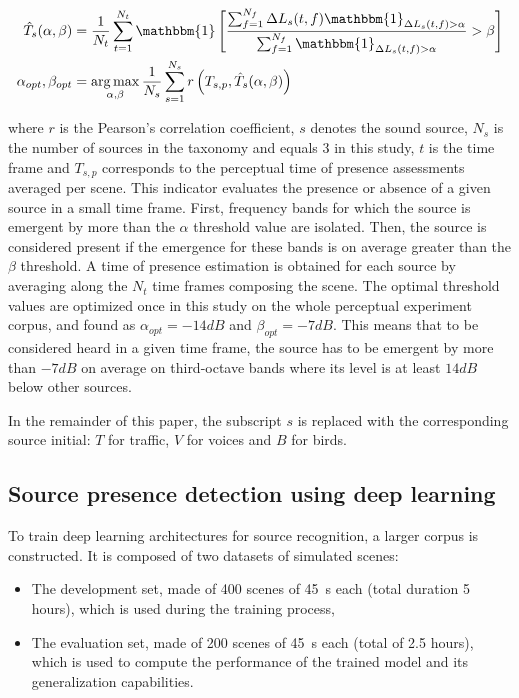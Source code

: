 \documentclass[11pt,a4paper]{article}
\DeclareMathOperator*{\argmax}{arg\,max}
\begin{document}
\begin{align}
\hat T_s(\alpha, \beta) &= \frac{1}{N_t}\sum_{t = 1}^{N_t}\mathbbm{1}\left[ \frac{\sum_{f = 1}^{N_f}\Delta L_{s}(t, f)\mathbbm{1}_{\Delta L_{s}(t, f)>\alpha}}{\sum_{f = 1}^{N_f}\mathbbm{1}_{\Delta L_{s}(t, f)>\alpha}}>\beta \right]\\
\alpha_{opt},\beta_{opt} &= \argmax_{\alpha, \beta}\frac{1}{N_s}\sum_{s = 1}^{N_s}r\left(T_{s, p}, \hat T_s(\alpha, \beta)\right)
\end{align}

where $r$ is the Pearson's correlation coefficient, $s$ denotes the sound source, $N_s$ is the number of sources in the taxonomy and equals 3 in this study, $t$ is the time frame and $T_{s, p}$ corresponds to the perceptual time of presence assessments averaged per scene. This indicator evaluates the presence or absence of a given source in a small time frame. First, frequency bands for which the source is emergent by more than the $\alpha$ threshold value are isolated. Then, the source is considered present if the emergence for these bands is on average greater than the $\beta$ threshold. A time of presence estimation is obtained for each source by averaging along the $N_t$ time frames composing the scene. The optimal threshold values are optimized once in this study on the whole perceptual experiment corpus, and found as $\alpha_{opt} = -14dB$ and $\beta_{opt} = -7dB$. This means that to be considered heard in a given time frame, the source has to be emergent by more than $-7dB$ on average on third-octave bands where its level is at least $14dB$ below other sources.

In the remainder of this paper, the subscript $s$ is replaced with the corresponding source initial: $T$ for traffic, $V$ for voices and $B$ for birds.


\subsection{Source presence detection using deep learning}
\label{sec:methods_deep}

To train deep learning architectures for source recognition, a larger corpus is constructed. It is composed of two datasets of simulated scenes:
\begin{itemize}
\item The development set, made of 400 scenes of 45~s each (total duration 5 hours), which is used during the training process,
\item The evaluation set, made of 200 scenes of 45~s each (total of 2.5 hours), which is used to compute the performance of the trained model and its generalization capabilities.
\end{itemize}
\end{document}
